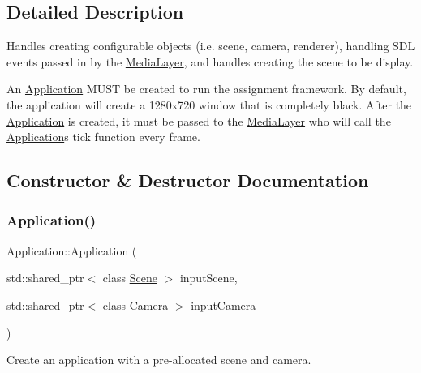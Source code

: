 \subsection{Detailed Description}
Handles creating configurable objects (i.\+e. scene, camera, renderer), handling S\+DL events passed in by the \hyperlink{class_media_layer}{Media\+Layer}, and handles creating the scene to be display.

An \textquotesingle{}\hyperlink{class_application}{Application}\textquotesingle{} M\+U\+ST be created to run the assignment framework. By default, the application will create a 1280x720 window that is completely black. After the \textquotesingle{}\hyperlink{class_application}{Application}\textquotesingle{} is created, it must be passed to the \textquotesingle{}\hyperlink{class_media_layer}{Media\+Layer}\textquotesingle{} who will call the \textquotesingle{}\hyperlink{class_application}{Application}\textquotesingle{}s tick function every frame.

\subsection{Constructor \& Destructor Documentation}
\hypertarget{class_application_a78cdcb03e6f06272f7c528fe407951c5}{}\label{class_application_a78cdcb03e6f06272f7c528fe407951c5}
\subsubsection{\texorpdfstring{Application()}{Application()}}
{\footnotesize\ttfamily Application\+::\+Application (\begin{DoxyParamCaption}\item[{std\+::shared\+\_\+ptr$<$ class \hyperlink{class_scene}{Scene} $>$}]{input\+Scene,  }\item[{std\+::shared\+\_\+ptr$<$ class \hyperlink{class_camera}{Camera} $>$}]{input\+Camera }\end{DoxyParamCaption})}



Create an application with a pre-\/allocated scene and camera.


